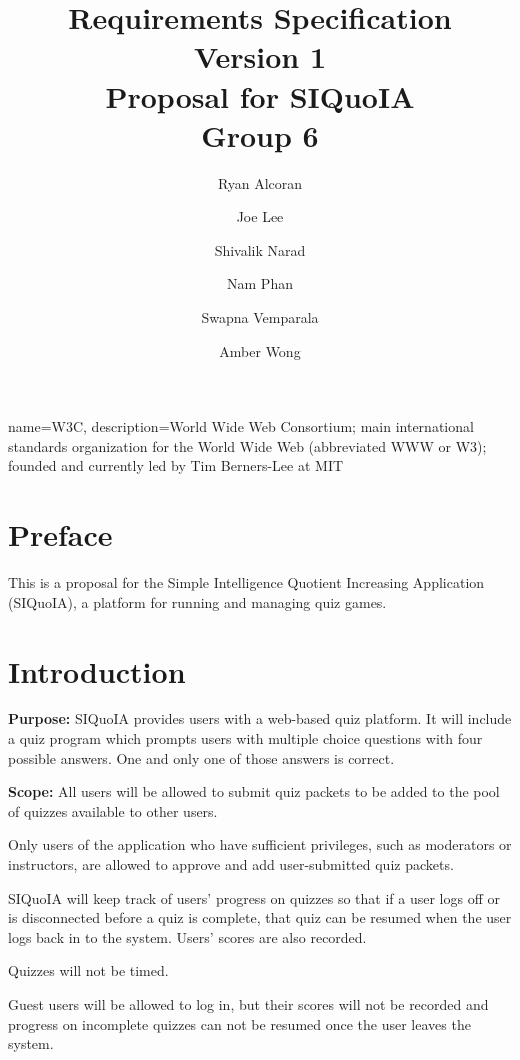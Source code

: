 \documentclass[12pt]{article}
\begin{document}
\title{Requirements Specification \\ {\large Version 1} \\[1em] {\large
    Proposal for SIQuoIA} \\[1em] Group 6}

\author{ Ryan Alcoran \and Joe Lee \and Shivalik Narad \and Nam Phan
  \and Swapna Vemparala \and Amber Wong }

\maketitle

 { name=W3C, description={World Wide Web
    Consortium; main international standards organization for the
    World Wide Web (abbreviated WWW or W3); founded and currently led
    by Tim Berners-Lee at MIT} }


\section{Preface}
This is a proposal for the Simple Intelligence Quotient Increasing
Application (SIQuoIA), a platform for running and managing quiz games.

\section{Introduction}
{\bf Purpose:} SIQuoIA provides users with a web-based quiz
platform. It will include a quiz program which prompts users with
multiple choice questions with four possible answers. One and only one
of those answers is correct.

{\bf Scope:} All users will be allowed to submit quiz packets to be
added to the pool of quizzes available to other users.

Only users of the application who have sufficient privileges, such as
moderators or instructors, are allowed to approve and add
user-submitted quiz packets.

SIQuoIA will keep track of users' progress on quizzes so that if a
user logs off or is disconnected before a quiz is complete, that quiz
can be resumed when the user logs back in to the system. Users' scores
are also recorded.

Quizzes will not be timed.

Guest users will be allowed to log in, but their scores will not be
recorded and progress on incomplete quizzes can not be resumed once
the user leaves the system.
\end{document}
